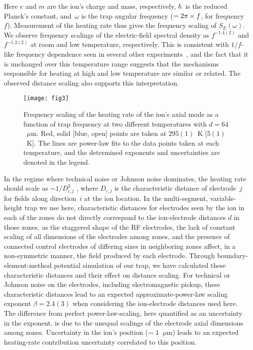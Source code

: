 \documentclass[reprint,twocolumn,prl,amsmath,amssymb,longbibliography,aps,superscriptaddress]{revtex4-1}
\begin{document}
\noindent Here $e$ and $m$ are the ion's charge and mass, respectively, $\hbar$~is the reduced Planck's constant, and~$\omega$ is the trap angular frequency ($=2\pi\times\nobreak f$, for frequency $f$).  Measurement of the heating rate thus gives the frequency scaling of $S_{E} (\omega)$.  We observe frequency scalings of the electric-field spectral density as $f^{-1.4(2)}$ and $f^{-1.3(2)}$ at room and low temperature, respectively.  This is consistent with $1/f$-like frequency dependence seen in several other experiments~\cite{Brownnutt2015}, and the fact that it is unchanged over this temperature range suggests that the mechanisms responsible for heating at high and low temperature are similar or related.  The observed distance scaling also supports this interpretation.

\begin{figure}[t b !]
\texttt{[image: fig3]}
\caption{Frequency scaling of the heating rate of the ion's axial mode as a function of trap frequency at two different temperatures with $d=64$~$\mu$m.  Red, solid [blue, open] points are taken at $295(1)$~K [$5(1)$~K]. The lines are power-law fits to the data points taken at each temperature, and the determined exponents and uncertainties are denoted in the legend.}
\label{fig:freqScaling}
\end{figure}


In the regime where technical noise or Johnson noise dominates, the heating rate should scale as $\sim 1/D_{i,j}^2$ \cite{Leibrandt2007}, where $D_{i,j}$ is the characteristic distance of electrode~$j$ for fields along direction~$i$ at the ion location.  In the multi-segment, variable-height trap we use here, characteristic distances for electrodes seen by the ion in each of the zones do not directly correspond to the ion-electrode distances $d$ in those zones, as the staggered shape of the RF electrodes, the lack of constant scaling of all dimensions of the electrodes among zones, and the presence of connected control electrodes of differing sizes in neighboring zones affect, in a non-symmetric manner, the field produced by each electrode.  Through boundary-element-method potential simulation of our trap, we have calculated these characteristic distances and their effect on distance scaling.  For technical or Johnson noise on the electrodes, including electromagnetic pickup, these characteristic distances lead to an expected approximate-power-law scaling exponent $\beta=2.4(3)$ when considering the ion-electrode distances used here.  The difference from perfect power-law-scaling, here quantified as an uncertainty in the exponent, is due to the unequal scalings of the electrode axial dimensions among zones.  Uncertainty in the ion's position ($\sim\nobreak1$~$\mu$m) leads to an expected heating-rate contribution uncertainty correlated to this position.
\end{document}
